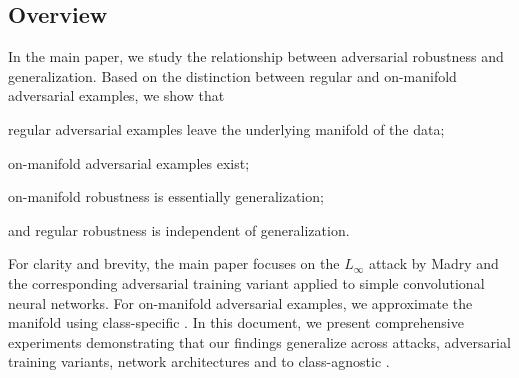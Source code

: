 \begin{appendix}

\section{Overview}

In the main paper, we study the relationship between adversarial robustness and generalization. Based on the distinction between regular and on-manifold adversarial examples, we show that
\begin{enumerate*}
	\item regular adversarial examples leave the underlying manifold of the data;
	\item on-manifold adversarial examples exist;
	\item on-manifold robustness is essentially generalization;
	\item and regular robustness is independent of generalization.
\end{enumerate*}
For clarity and brevity, the main paper focuses on the $L_{\infty}$ attack by Madry \etal \cite{MadryICLR2018} and the corresponding adversarial training variant applied to simple
convolutional neural networks. For on-manifold adversarial examples, we approximate the manifold using class-specific \VAEGANs \cite{LarsenICML2016,RoscaARXIV2017}. In this document, we present comprehensive experiments demonstrating that our findings generalize across attacks, adversarial training variants, network architectures and to class-agnostic \VAEGANs.


\end{appendix}

